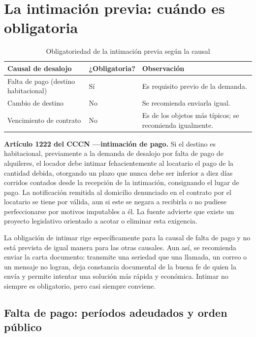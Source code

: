 \documentclass[12pt,oneside]{book}
\begin{document}
\section{La intimación previa: cuándo es obligatoria}

\begin{table}[H]
\centering
\caption{Obligatoriedad de la intimación previa según la causal}
\begin{tabularx}{\textwidth}{>{\raggedright\arraybackslash}p{} >{\raggedright\arraybackslash}p{} X}
\toprule
\textbf{Causal de desalojo} & \textbf{¿Obligatoria?} & \textbf{Observación} \\
\midrule
Falta de pago (destino habitacional) & Sí & Es requisito previo de la demanda. \\
Cambio de destino & No & Se recomienda enviarla igual. \\
Vencimiento de contrato & No & Es de los objetos más típicos; se recomienda igualmente. \\
\bottomrule
\end{tabularx}
\end{table}

\begin{normacitada}
\textbf{Artículo 1222 del CCCN ---intimación de pago.} Si el destino es habitacional, previamente a la demanda de desalojo por falta de pago de alquileres, el locador debe intimar fehacientemente al locatario el pago de la cantidad debida, otorgando un plazo que nunca debe ser inferior a diez días corridos contados desde la recepción de la intimación, consignando el lugar de pago. La notificación remitida al domicilio denunciado en el contrato por el locatario se tiene por válida, aun si este se negara a recibirla o no pudiese perfeccionarse por motivos imputables a él. La fuente advierte que existe un proyecto legislativo orientado a acotar o eliminar esta exigencia.
\end{normacitada}

La obligación de intimar rige específicamente para la causal de falta de pago y no está prevista de igual manera para las otras causales. Aun así, se recomienda enviar la carta documento: transmite una seriedad que una llamada, un correo o un mensaje no logran, deja constancia documental de la buena fe de quien la envía y permite intentar una solución más rápida y económica. Intimar no siempre es obligatorio, pero casi siempre conviene.

\subsection{Falta de pago: períodos adeudados y orden público}
\end{document}
